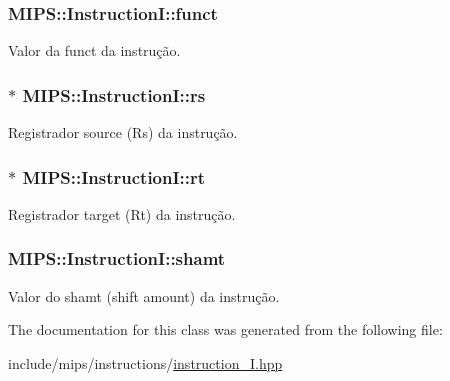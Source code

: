 \subsubsection[{\texorpdfstring{funct}{funct}}]{ M\+I\+P\+S\+::\+Instruction\+I\+::funct\hspace{0.3cm}{\ttfamily [protected]}}\hypertarget{classMIPS_1_1InstructionI_a5c6efcbbd233a7447c1fe24ea0a1e558}{}\label{classMIPS_1_1InstructionI_a5c6efcbbd233a7447c1fe24ea0a1e558}
Valor da funct da instrução. 
\subsubsection[{\texorpdfstring{rs}{rs}}]{$\ast$ M\+I\+P\+S\+::\+Instruction\+I\+::rs\hspace{0.3cm}{\ttfamily [protected]}}\hypertarget{classMIPS_1_1InstructionI_a2be191d5b3dce505e2e626ec02eb4d62}{}\label{classMIPS_1_1InstructionI_a2be191d5b3dce505e2e626ec02eb4d62}
Registrador source (Rs) da instrução. 
\subsubsection[{\texorpdfstring{rt}{rt}}]{$\ast$ M\+I\+P\+S\+::\+Instruction\+I\+::rt\hspace{0.3cm}{\ttfamily [protected]}}\hypertarget{classMIPS_1_1InstructionI_add1db07a5c954f35271de8c8a5737487}{}\label{classMIPS_1_1InstructionI_add1db07a5c954f35271de8c8a5737487}
Registrador target (Rt) da instrução. 
\subsubsection[{\texorpdfstring{shamt}{shamt}}]{ M\+I\+P\+S\+::\+Instruction\+I\+::shamt\hspace{0.3cm}{\ttfamily [protected]}}\hypertarget{classMIPS_1_1InstructionI_aa9b6da37c374c2ec8d96448d341e5e7d}{}\label{classMIPS_1_1InstructionI_aa9b6da37c374c2ec8d96448d341e5e7d}
Valor do shamt (shift amount) da instrução. 

The documentation for this class was generated from the following file\+:\begin{DoxyCompactItemize}
\item 
include/mips/instructions/\hyperlink{instruction__I_8hpp}{instruction\+\_\+\+I.\+hpp}\end{DoxyCompactItemize}
